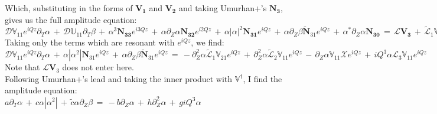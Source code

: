 \documentclass[letterpaper,12pt]{article}
\begin{document}
Which, substituting in the forms of $\mathbf{V_1}$ and $\mathbf{V_2}$ and taking Umurhan+'s $\mathbf{N_3}$, gives us the full amplitude equation:\\

$\mathcal{D}\mathbb{V}_{11} e^{iQz}\partial_T \alpha \, + \, \mathcal{D}\mathbb{U}_{11} \partial_T \beta \, + \, \alpha^3 \mathbf{N_{33}} e^{i3Qz} \, + \, \alpha \partial_Z \alpha \mathbf{N_{32}} e^{i2Qz} \, + \, \alpha\left|\alpha\right|^2 \mathbf{N_{31}} e^{iQz} \, + \, \alpha \partial_Z\beta \widetilde{\mathbf{N}}_{31} e^{iQz} \, + \, \alpha^* \partial_Z \alpha \mathbf{N_{30}} \, = \, \mathcal{L}\mathbf{V_3} \, + \, \widetilde{\mathcal{L}}_1 \mathbb{V}_{22} 2 \alpha \partial_Z \alpha e^{i2Qz} \, + \, \widetilde{\mathcal{L}}_1 \mathbb{V}_{20} 2 \left|\alpha\right| \partial_Z \alpha \, - \, \widetilde{\mathcal{L}}_1 \mathbb{V}_{21} \partial_Z^2 \alpha e^{iQz} \, - \, \widetilde{\mathcal{L}}_1 \mathbb{U}_{20} \partial_Z^2 \beta \, + \, \widetilde{\mathcal{L}}_2 \mathbb{V}_{11} e^{iQz} \partial_Z^2 \alpha \, + \, \widetilde{\mathcal{L}}_2 \mathbb{U}_{11} \partial_Z^2 \beta \, - \, \mathcal{X}\mathbb{V}_{11} e^{iQz} \partial_Z \alpha \, - \, \mathcal{X} \mathbb{U}_{11} \partial_Z \beta \, + \, \mathcal{L}_3 \mathbb{V}_{11} e^{iQz} iQ^3 \alpha $\\

Taking only the terms which are resonant with $e^{iQz}$, we find: \\

$\mathcal{D} \mathbb{V}_{11} e^{iQz}\partial_T \alpha \, + \, \alpha \left| \alpha^2 \right| \mathbf{N}_{31} e^{iQz} \, + \, \alpha \partial_Z \beta \widetilde{\mathbf{N}}_{31} e^{iQz} \, = \, - \partial_Z^2 \alpha \widetilde{\mathcal{L}}_1 \mathbb{V}_{21} e^{iQz} \, + \, \partial_Z^2 \alpha \widetilde{\mathcal{L}}_2 \mathbb{V}_{11} e^{iQz} \, - \, \partial_Z \alpha \mathbb{V}_{11}\mathcal{X}e^{iQz} \, + \, iQ^3 \alpha \mathcal{L}_3 \mathbb{V}_{11} e^{iQz}$ \\

Note that $\mathcal{L}\mathbf{V}_3$ does not enter here.\\

Following Umurhan+'s lead and taking the inner product with $\mathbb{V}^\dagger$, I find the amplitude equation: \\

$a \partial_T \alpha \, + \, c \alpha \left|\alpha^2\right| \, + \, \widetilde{c} \alpha \partial_Z \beta \, = \, - b \partial_Z \alpha \, + \, h \partial_Z^2 \alpha \, + \, g i Q^3 \alpha$ \\
\end{document}
